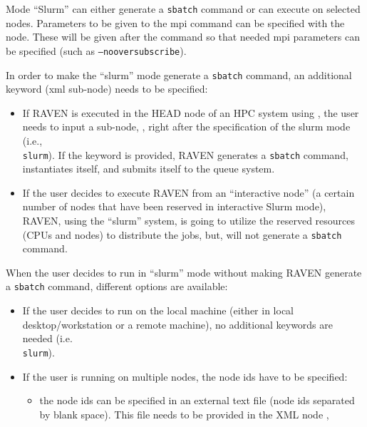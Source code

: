 \begin{itemize}
\begin{itemize}
      Mode ``Slurm''  can either generate a \texttt{sbatch} command or can execute
      on selected nodes.
      Parameters to be given to the mpi command can be specified with the  node.  These will be given after the   command so that needed mpi parameters can be specified (such as \texttt{--nooversubscribe}).

      In order to make the ``slurm'' mode generate a \texttt{sbatch} command, an
      additional keyword (xml sub-node) needs to be specified:
         \begin{itemize}
         \item If RAVEN is executed in the HEAD node of an HPC system using
           \cite{SLURM}, the user needs to input a sub-node, ,
           right after the specification of the slurm mode (i.e.,\\
             \texttt{slurm}).
             If the keyword is provided, RAVEN generates a \texttt{sbatch}
             command, instantiates itself, and submits itself to the queue
             system.
           \item If the user decides to execute RAVEN from an ``interactive
             node'' (a certain number of nodes that have been reserved in
             interactive Slurm mode), RAVEN, using the ``slurm'' system, is going to
             utilize the reserved resources (CPUs and nodes) to distribute the
             jobs, but, will not generate a \texttt{sbatch} command.
         \end{itemize}
     When the user decides to run in ``slurm'' mode without making RAVEN generate
     a \texttt{sbatch} command, different options are available:
      \begin{itemize}
           \item If the user decides to run on the local machine (either in
             local desktop/workstation or a remote machine), no additional
             keywords are needed (i.e.\\
             \texttt{slurm}).
           \item If the user is running on multiple nodes, the node ids have
             to be specified:
           \begin{itemize}
              \item the node ids can be specified in an external text file
                (node ids separated by blank space).
                This file needs to be provided in the XML node ,

\end{itemize}
\end{itemize}
\end{itemize}
\end{itemize}
